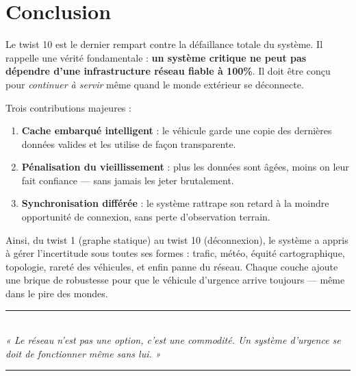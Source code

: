 \documentclass[12pt,a4paper]{article}
\theoremstyle{definition}
\theoremstyle{remark}
\begin{document}
\newpage

\section*{Conclusion}

Le twist 10 est le dernier rempart contre la défaillance totale
du système. Il rappelle une vérité fondamentale : \textbf{un système
critique ne peut pas dépendre d’une infrastructure réseau fiable
à 100\%}. Il doit être conçu pour \emph{continuer à servir} même
quand le monde extérieur se déconnecte.

\medskip
Trois contributions majeures :

\begin{enumerate}[leftmargin=2em, itemsep=4pt]
  \item \textbf{Cache embarqué intelligent} : le véhicule garde une
        copie des dernières données valides et les utilise de façon
        transparente.
  \item \textbf{Pénalisation du vieillissement} : plus les données
        sont âgées, moins on leur fait confiance — sans jamais les
        jeter brutalement.
  \item \textbf{Synchronisation différée} : le système rattrape son
        retard à la moindre opportunité de connexion, sans perte
        d’observation terrain.
\end{enumerate}

\medskip
Ainsi, du twist 1 (graphe statique) au twist 10 (déconnexion), le
système a appris à gérer l’incertitude sous toutes ses formes :
trafic, météo, équité cartographique, topologie, rareté des véhicules,
et enfin panne du réseau. Chaque couche ajoute une brique de robustesse
pour que le véhicule d’urgence arrive toujours — même dans le pire
des mondes.

\medskip
\begin{center}
  {\color{twist}\rule{0.5\linewidth}{1pt}}\\[0.5em]
  {\itshape « Le réseau n’est pas une option, c’est une commodité.
  Un système d’urgence se doit de fonctionner même sans lui. »}\\[0.5em]
  {\color{twist}\rule{0.5\linewidth}{1pt}}
\end{center}
\end{document}
